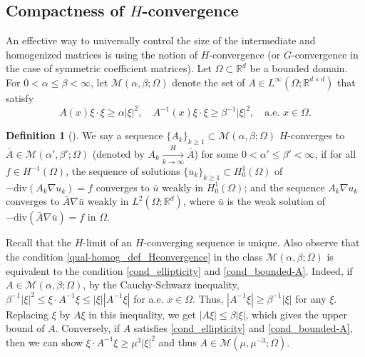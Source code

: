 \documentclass[reqno,12pt]{amsart} %
\theoremstyle{definition}
\newtheorem{definition}[theorem]{Definition}
\theoremstyle{remark}
\numberwithin{equation}{section}
\newcommand{\R}{\mathbb{R}}
\begin{document}
\subsection{\texorpdfstring{Compactness of $H$-convergence}{Compactness of H-convergence}}\label{sec_compactness-H}

An effective way to universally control the size of the intermediate and homogenized matrices is using the notion of $H$-convergence (or $G$-convergence in the case of symmetric coefficient matrices).
Let $\Omega\subset \R^d$ be a bounded domain. For $0<\alpha\le \beta < \infty$, let $\mathcal{M}(\alpha,\beta;\Omega)$ denote the set of $A\in L^\infty(\Omega;\R^{d\times d})$ that satisfy
\begin{equation}\label{qual-homog_def_Hconvergence}
	A(x)\xi\cdot \xi \ge \alpha |\xi|^2,\quad A^{-1}(x)\xi\cdot \xi \ge \beta^{-1}|\xi|^2, \quad \text{a.e. } x\in \Omega.
\end{equation}

\begin{definition}[\cite{T09}]\label{H-convergence}
	We say a sequence $\{A_k\}_{k\ge 1} \subset \mathcal{M}(\alpha,\beta;\Omega)$ $H$-converges to $\bar{A}\in \mathcal{M}(\alpha',\beta';\Omega)$ (denoted by $A_k \xrightarrow[k\to \infty]{H} \bar{A}$) for some $0<\alpha'\le \beta'<\infty$, if for all $f\in H^{-1}(\Omega)$, the sequence of solutions $\{u_k\}_{k\ge 1} \subset H^1_0(\Omega)$ of $-\mathrm{div} (A_k \nabla u_k) = f$ converges to $\bar{u}$ weakly in $H^1_0(\Omega)$; and the sequence $A_k \nabla u_k$ converges to $\bar{A} \nabla \bar{u}$ weakly in $L^2(\Omega;\R^d)$, where $\bar{u}$ is the weak solution of $-\mathrm{div} (\bar{A} \nabla \bar{u}) = f$ in $\Omega$.
\end{definition}

Recall that the $H$-limit of an $H$-converging sequence is unique. Also observe that the condition \eqref{qual-homog_def_Hconvergence} in the class $\mathcal{M}(\alpha, \beta; \Omega)$ is equivalent to the condition \eqref{cond_ellipticity} and \eqref{cond_bounded-A}. Indeed, if $A\in \mathcal{M}(\alpha, \beta; \Omega)$, by the Cauchy-Schwarz inequality, $\beta^{-1}|\xi|^2 \le \xi\cdot A^{-1}\xi \le |\xi| |A^{-1}\xi|$ for a.e. $x\in\Omega$. Thus, $|A^{-1}\xi| \ge \beta^{-1}|\xi|$ for any $\xi$. Replacing $\xi$ by $A\xi$ in this inequality, we get $|A\xi| \le \beta |\xi|$, which gives the upper bound of $A$. Conversely, if $A$ satisfies \eqref{cond_ellipticity} and \eqref{cond_bounded-A}, then we can show $\xi \cdot A^{-1}\xi \ge \mu^3 |\xi|^2$ and thus $A \in \mathcal{M}(\mu, \mu^{-3}; \Omega)$.
 
\end{document}
